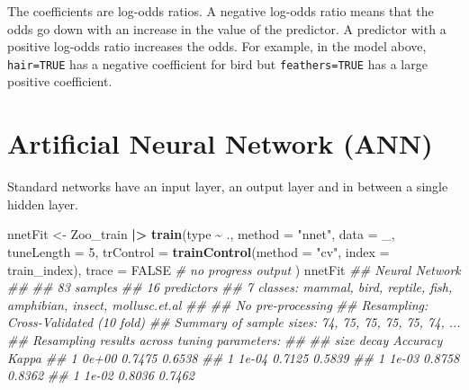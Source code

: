 \documentclass[
  notitlepage]{book}
\newenvironment{Shaded}{\begin{snugshade}}{\end{snugshade}}
\newcommand{\CommentTok}[1]{\textcolor[rgb]{0.56,0.35,0.01}{\textit{#1}}}
\newcommand{\DataTypeTok}[1]{\textcolor[rgb]{0.13,0.29,0.53}{#1}}
\newcommand{\DecValTok}[1]{\textcolor[rgb]{0.00,0.00,0.81}{#1}}
\newcommand{\ErrorTok}[1]{\textcolor[rgb]{0.64,0.00,0.00}{\textbf{#1}}}
\newcommand{\KeywordTok}[1]{\textcolor[rgb]{0.13,0.29,0.53}{\textbf{#1}}}
\newcommand{\NormalTok}[1]{#1}
\newcommand{\OperatorTok}[1]{\textcolor[rgb]{0.81,0.36,0.00}{\textbf{#1}}}
\newcommand{\OtherTok}[1]{\textcolor[rgb]{0.56,0.35,0.01}{#1}}
\newcommand{\StringTok}[1]{\textcolor[rgb]{0.31,0.60,0.02}{#1}}
\begin{document}
The coefficients are log-odds ratios. A negative log-odds ratio means that the odds go down with an increase in
the value of the predictor. A predictor with a
positive log-odds ratio increases the odds. For example,
in the model above, \texttt{hair=TRUE} has a negative coefficient for
bird but \texttt{feathers=TRUE} has a large positive coefficient.

\hypertarget{artificial-neural-network-ann}{%
\section{Artificial Neural Network (ANN)}\label{artificial-neural-network-ann}}

Standard networks have an input layer, an output layer and in between
a single hidden layer.

\begin{Shaded}
\begin{Highlighting}[]
\NormalTok{nnetFit \textless{}{-}}\StringTok{ }\NormalTok{Zoo\_train }\OperatorTok{|}\ErrorTok{\textgreater{}}\StringTok{ }\KeywordTok{train}\NormalTok{(type }\OperatorTok{\textasciitilde{}}\StringTok{ }\NormalTok{.,}
  \DataTypeTok{method =} \StringTok{"nnet"}\NormalTok{,}
  \DataTypeTok{data =}\NormalTok{ \_,}
    \DataTypeTok{tuneLength =} \DecValTok{5}\NormalTok{,}
    \DataTypeTok{trControl =} \KeywordTok{trainControl}\NormalTok{(}\DataTypeTok{method =} \StringTok{"cv"}\NormalTok{, }
                             \DataTypeTok{index =}\NormalTok{ train\_index),}
  \DataTypeTok{trace =} \OtherTok{FALSE} \CommentTok{\# no progress output}
\NormalTok{  )}
\NormalTok{nnetFit}
\CommentTok{\#\# Neural Network }
\CommentTok{\#\# }
\CommentTok{\#\# 83 samples}
\CommentTok{\#\# 16 predictors}
\CommentTok{\#\#  7 classes: \textquotesingle{}mammal\textquotesingle{}, \textquotesingle{}bird\textquotesingle{}, \textquotesingle{}reptile\textquotesingle{}, \textquotesingle{}fish\textquotesingle{}, \textquotesingle{}amphibian\textquotesingle{}, \textquotesingle{}insect\textquotesingle{}, \textquotesingle{}mollusc.et.al\textquotesingle{} }
\CommentTok{\#\# }
\CommentTok{\#\# No pre{-}processing}
\CommentTok{\#\# Resampling: Cross{-}Validated (10 fold) }
\CommentTok{\#\# Summary of sample sizes: 74, 75, 75, 75, 75, 74, ... }
\CommentTok{\#\# Resampling results across tuning parameters:}
\CommentTok{\#\# }
\CommentTok{\#\#   size  decay  Accuracy  Kappa }
\CommentTok{\#\#   1     0e+00  0.7475    0.6538}
\CommentTok{\#\#   1     1e{-}04  0.7125    0.5839}
\CommentTok{\#\#   1     1e{-}03  0.8758    0.8362}
\CommentTok{\#\#   1     1e{-}02  0.8036    0.7462}

\end{Highlighting}
\end{Shaded}
\end{document}

